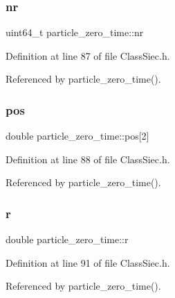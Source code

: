 \mbox{\label{structparticle__zero__time_a866e480ab047b43e3654d6843aa44276}} 
\subsubsection{\texorpdfstring{nr}{nr}}
{\footnotesize\ttfamily uint64\+\_\+t particle\+\_\+zero\+\_\+time\+::nr}



Definition at line 87 of file Class\+Siec.\+h.



Referenced by particle\+\_\+zero\+\_\+time().

\mbox{\label{structparticle__zero__time_a6101461222bc79283b8c8a59cb6e7dee}} 
\subsubsection{\texorpdfstring{pos}{pos}}
{\footnotesize\ttfamily double particle\+\_\+zero\+\_\+time\+::pos\mbox{[}2\mbox{]}}



Definition at line 88 of file Class\+Siec.\+h.



Referenced by particle\+\_\+zero\+\_\+time().

\mbox{\label{structparticle__zero__time_a06f14406f824aaf0c0cd61054876fd56}} 
\subsubsection{\texorpdfstring{r}{r}}
{\footnotesize\ttfamily double particle\+\_\+zero\+\_\+time\+::r}



Definition at line 91 of file Class\+Siec.\+h.



Referenced by particle\+\_\+zero\+\_\+time().

